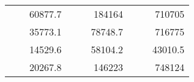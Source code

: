 \begin{table}[]
\begin{tabular}{|ccrccrccc}
\rowcolor[HTML]{DDFDFF} 
\multicolumn{1}{|c|}{\cellcolor[HTML]{FFFFC7}}                                & \multicolumn{1}{c|}{\cellcolor[HTML]{DDFDFF}}                      & \multicolumn{1}{r|}{\cellcolor[HTML]{DAE8FC}60877.7}   & \multicolumn{1}{c|}{\cellcolor[HTML]{FFFFC7}}                                & \multicolumn{1}{c|}{\cellcolor[HTML]{DDFDFF}}                       & \multicolumn{1}{r|}{\cellcolor[HTML]{DDFDFF}184164}    & \multicolumn{1}{c|}{\cellcolor[HTML]{FFFFC7}}                                & \multicolumn{1}{c|}{\cellcolor[HTML]{DDFDFF}}                      & \multicolumn{1}{r|}{\cellcolor[HTML]{DDFDFF}710705}    \\ \cline{3-3} \cline{6-6} \cline{9-9} 
\multicolumn{1}{|c|}{\cellcolor[HTML]{FFFFC7}}                                & \multicolumn{1}{c|}{\cellcolor[HTML]{DDFDFF}}                      & \multicolumn{1}{r|}{\cellcolor[HTML]{DDFDFF}35773.1}   & \multicolumn{1}{c|}{\cellcolor[HTML]{FFFFC7}}                                & \multicolumn{1}{c|}{\cellcolor[HTML]{DDFDFF}}                       & \multicolumn{1}{r|}{\cellcolor[HTML]{DAE8FC}78748.7}   & \multicolumn{1}{c|}{\cellcolor[HTML]{FFFFC7}}                                & \multicolumn{1}{c|}{\cellcolor[HTML]{DDFDFF}}                      & \multicolumn{1}{r|}{\cellcolor[HTML]{DAE8FC}716775}    \\ \cline{3-3} \cline{6-6} \cline{9-9} 
\rowcolor[HTML]{DDFDFF} 
\multicolumn{1}{|c|}{\cellcolor[HTML]{FFFFC7}}                                & \multicolumn{1}{c|}{\cellcolor[HTML]{DDFDFF}}                      & \multicolumn{1}{r|}{\cellcolor[HTML]{DAE8FC}14529.6}   & \multicolumn{1}{c|}{\cellcolor[HTML]{FFFFC7}}                                & \multicolumn{1}{c|}{\cellcolor[HTML]{DDFDFF}}                       & \multicolumn{1}{r|}{\cellcolor[HTML]{DDFDFF}58104.2}   & \multicolumn{1}{c|}{\cellcolor[HTML]{FFFFC7}}                                & \multicolumn{1}{c|}{\cellcolor[HTML]{DDFDFF}}                      & \multicolumn{1}{r|}{\cellcolor[HTML]{DDFDFF}43010.5}   \\ \cline{3-3} \cline{6-6} \cline{9-9} 
\multicolumn{1}{|c|}{\cellcolor[HTML]{FFFFC7}}                                & \multicolumn{1}{c|}{\cellcolor[HTML]{DDFDFF}}                      & \multicolumn{1}{r|}{\cellcolor[HTML]{DDFDFF}20267.8}   & \multicolumn{1}{c|}{\cellcolor[HTML]{FFFFC7}}                                & \multicolumn{1}{c|}{\cellcolor[HTML]{DDFDFF}}                       & \multicolumn{1}{r|}{\cellcolor[HTML]{DAE8FC}146223}    & \multicolumn{1}{c|}{\cellcolor[HTML]{FFFFC7}}                                & \multicolumn{1}{c|}{\cellcolor[HTML]{DDFDFF}}                      & \multicolumn{1}{r|}{\cellcolor[HTML]{DAE8FC}748124}    \\ \cline{3-3} \cline{6-6} \cline{9-9} 

\end{tabular}
\end{table}
